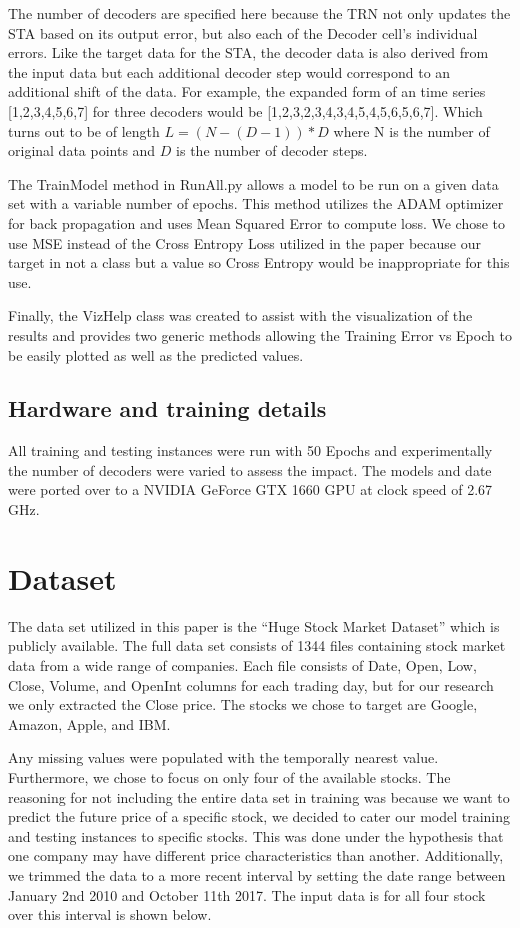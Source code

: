 \documentclass{article}
\begin{document}
    The number of decoders are specified here because the TRN not only updates the STA based on its output error, but also each of the Decoder cell’s individual errors. Like the target data for the STA, the decoder data is also derived from the input data but each additional decoder step would correspond to an additional shift of the data. For example, the expanded form of an time series [1,2,3,4,5,6,7] for three decoders would be [1,2,3,2,3,4,3,4,5,4,5,6,5,6,7]. Which turns out to be of length $L=(N-(D-1))*D$ where N is the number of original data points and $D$ is the number of decoder steps.
    
    The TrainModel method in RunAll.py allows a model to be run on a given data set with a variable number of epochs. This method utilizes the ADAM optimizer for back propagation and uses Mean Squared Error to compute loss. We chose to use MSE instead of the Cross Entropy Loss utilized in the paper because our target in not a class but a value so Cross Entropy would be inappropriate for this use.
    
    Finally, the VizHelp class was created to assist with the visualization of the results and provides two generic methods allowing the Training Error vs Epoch to be easily plotted as well as the predicted values.
    
    \subsection{Hardware and training details}
    All training and testing instances were run with 50 Epochs and experimentally the number of decoders were varied to assess the impact. The models and date were ported over to a NVIDIA GeForce GTX 1660 GPU at clock speed of 2.67 GHz.

\section{Dataset}
    The data set utilized in this paper is the “Huge Stock Market Dataset” which is publicly available. The full data set consists of 1344 files containing stock market data from a wide range of companies. Each file consists of Date, Open, Low, Close, Volume, and OpenInt columns for each trading day, but for our research we only extracted the Close price. The stocks we chose to target are Google, Amazon, Apple, and IBM.
    
    Any missing values were populated with the temporally nearest value. Furthermore, we chose to focus on only four of the available stocks. The reasoning for not including the entire data set in training was because we want to predict the future price of a specific stock, we decided to cater our model training and testing instances to specific stocks. This was done under the hypothesis that one company may have different price characteristics than another. Additionally, we trimmed the data to a more recent interval by setting the date range between January 2nd 2010 and October 11th 2017. The input data is for all four stock over this interval is shown below.
    
\end{document}
